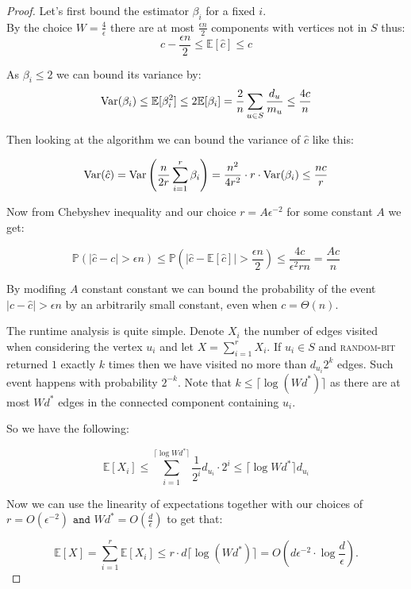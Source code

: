 \begin{proof}
Let's first bound the estimator $\beta_i$ for a fixed $i$. \\By the choice $W = \frac{4}{\epsilon}$ there are at most $\frac{\epsilon n}{2}$ components with vertices not in $S$ thus:
\begin{equation*}
 c -\frac{\epsilon n}2 \leq \mathbb{E}[\hat{c}] \leq c   
\end{equation*}

As $\beta_i \leq 2$ we can bound its variance by:
\begin{equation*}
 \operatorname{\mathrm{Var}}(\beta_i) \leq \mathbb{E}[\beta_i^2] \leq 2\mathbb{E}[\beta_i] = \frac{2}{n} \sum\limits_{u \in S}\frac{d_u}{m_u} \leq \frac{4c}{n}   
\end{equation*}

Then looking at the algorithm we can bound the variance of $\hat c$ like this:

\begin{equation*}
 \operatorname{\mathrm{Var}} (\hat c) = \operatorname{\mathrm{Var}}\left(\frac{n}{2r}\sum\limits_{i=1}^{r}\beta_i\right) = \frac{n^2}{4r^2}\cdot r \cdot \operatorname{\mathrm{Var}}(\beta_i) \leq \frac{nc}{r}   
\end{equation*}

Now from Chebyshev inequality and our choice $r = A\epsilon^{-2}$ for some constant $A$ we get:

\begin{equation*}
\mathbb{P}(|\hat c - c| > \epsilon n) \leq \mathbb{P}\left(|\hat c - \mathbb{E}[\hat c]| > \frac{\epsilon n}{2}\right) \leq \frac{4c}{\epsilon^2 r n} = \frac{Ac}{n}
\end{equation*}


By modifing $A$ constant constant we can bound the probability of the event $|c - \hat{c}| > \epsilon n$ by an arbitrarily small constant, even when $c = \Theta(n)$.

The runtime analysis is quite simple. Denote $X_i$ the number of edges visited when considering the vertex $u_i$ and let $X = \sum\limits_{i = 1}^r X_i$. If $u_i\in S$ and \textsc{random-bit} returned $1$ exactly $k$ times then we have visited no more than $d_{u_i}2^k$ edges. Such event happens with probability $2^{-k}$. Note that $k \leq \lceil \log{(Wd^*)} \rceil$ as there are at most $Wd^*$ edges in the connected component containing $u_i$. 

So we have the following:

\begin{equation*}
    \mathbb{E}[X_i] \leq \sum\limits_{i = 1}^{\lceil \log{Wd^*} \rceil} \frac{1}{2^i} d_{u_i} \cdot2^i \leq  \lceil \log{Wd^*} \rceil d_{u_i}
\end{equation*}

Now we can use the linearity of expectations together with our choices of $ r = O(\epsilon^{-2})\texttt{ and } Wd^* = O(\frac{d}\epsilon)$ to get that:

\begin{equation*}
    \mathbb{E}[X] = \sum\limits_{i=1}^r \mathbb{E}[X_i] \leq r \cdot d\lceil \log{(Wd^*)}\rceil = O\left(d\epsilon^{-2} \cdot \log{\frac{d}\epsilon}\right).
\end{equation*}
\end{proof}


